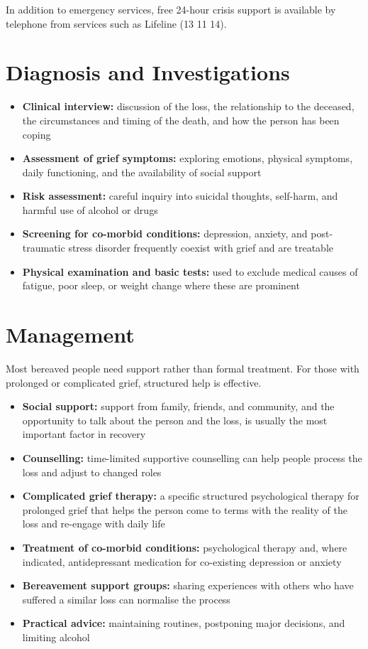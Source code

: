 In addition to emergency services, free 24-hour crisis support is available by telephone from services such as Lifeline (13 11 14).

\section*{Diagnosis and Investigations}
\begin{itemize}
    \item \textbf{Clinical interview:} discussion of the loss, the relationship to the deceased, the circumstances and timing of the death, and how the person has been coping
    \item \textbf{Assessment of grief symptoms:} exploring emotions, physical symptoms, daily functioning, and the availability of social support
    \item \textbf{Risk assessment:} careful inquiry into suicidal thoughts, self-harm, and harmful use of alcohol or drugs
    \item \textbf{Screening for co-morbid conditions:} depression, anxiety, and post-traumatic stress disorder frequently coexist with grief and are treatable
    \item \textbf{Physical examination and basic tests:} used to exclude medical causes of fatigue, poor sleep, or weight change where these are prominent
\end{itemize}

\section*{Management}
Most bereaved people need support rather than formal treatment. For those with prolonged or complicated grief, structured help is effective.

\begin{itemize}
    \item \textbf{Social support:} support from family, friends, and community, and the opportunity to talk about the person and the loss, is usually the most important factor in recovery
    \item \textbf{Counselling:} time-limited supportive counselling can help people process the loss and adjust to changed roles
    \item \textbf{Complicated grief therapy:} a specific structured psychological therapy for prolonged grief that helps the person come to terms with the reality of the loss and re-engage with daily life
    \item \textbf{Treatment of co-morbid conditions:} psychological therapy and, where indicated, antidepressant medication for co-existing depression or anxiety
    \item \textbf{Bereavement support groups:} sharing experiences with others who have suffered a similar loss can normalise the process
    \item \textbf{Practical advice:} maintaining routines, postponing major decisions, and limiting alcohol
\end{itemize}

